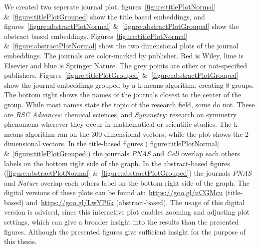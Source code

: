 \documentclass[../../Thesis.tex]{subfiles}
\begin{document}
We created two seperate journal plot, figures~\ref{figure:titlePlotNormal} \&~\ref{figure:titlePlotGrouped} show the title based embeddings, and figures~\ref{figure:abstractPlotNormal} \&~\ref{figure:abstractPlotGrouped} show the abstract based embeddings.
Figures~\ref{figure:titlePlotNormal} \&~\ref{figure:abstractPlotNormal} show the two dimensional plots of the journal embeddings. The journals are color-marked by publisher. Red is Wiley, lime is Elsevier and blue is Springer Nature. The grey points are other or not-specified publishers.
Figures~\ref{figure:titlePlotGrouped} \&~\ref{figure:abstractPlotGrouped} show the journal embeddings grouped by a k-means algorithm, creating 8 groups. The bottom right shows the names of the journals closest to the center of the group. While most names state the topic of the research field, some do not. These are \textit{RSC Advances}: chemical sciences, and \textit{Symmetry}:  research on symmetry phenomena wherever they occur in mathematical or scientific studies. The k-means algorithm ran on the 300-dimensional vectors, while the plot shows the 2-dimensional vectors. In the title-based figures (\ref{figure:titlePlotNormal} \&~\ref{figure:titlePlotGrouped}) the journals \textit{PNAS} and \textit{Cell} overlap each others labels on the bottom right side of the graph. In the abstract-based figures (\ref{figure:abstractPlotNormal} \&~\ref{figure:abstractPlotGrouped}) the journals \textit{PNAS} and \textit{Nature} overlap each others label on the bottom right side of the graph.
The digital versions of these plots can be found at:~\url{https://goo.gl/nCGMcu} (title-based) and~\url{https://goo.gl/LwYP6k} (abstract-based). The usage of this digital version is advised, since this interactive plot enables zooming and adjusting plot settings, which can give a broader insight into the results than the presented figures. Although the presented figures give sufficient insight for the purpose of this thesis.
\end{document}

